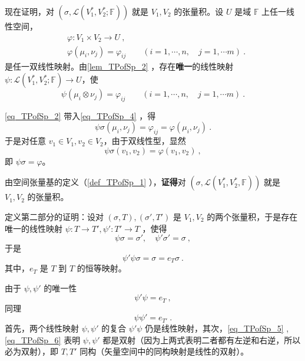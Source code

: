 现在证明，对 $(\sigma,\mathcal L(V_1^*,V_2^*;\mathbb F))$ 就是 $V_1,V_2$ 的张量积。设 $U$ 是域 $\mathbb F$ 上任一线性空间，
\begin{equation}\label{eq_TPofSp_3}
\begin{aligned}
&\varphi:V_1\times V_2\rightarrow U~,\\
&\varphi(\mu_i,\nu_j)=\varphi_{ij}\qquad (i=1,\cdots,n,\quad j=1,\cdots m)~.
\end{aligned}
\end{equation}
是任一双线性映射。由\autoref{lem_TPofSp_2} ，存在\textbf{唯一}的线性映射 $\psi:\mathcal L(V_1^*,V_2^*;\mathbb F)\rightarrow U$，使
\begin{equation}\label{eq_TPofSp_4}
\psi(\mu_i\otimes \nu_j)=\varphi_{ij}\qquad( i=1,\cdots,n,\quad j=1,\cdots m)~.
\end{equation}

\autoref{eq_TPofSp_2} 带入\autoref{eq_TPofSp_4}  ，得
\begin{equation}
\psi\sigma(\mu_i,\nu_j)=\varphi_{ij}=\varphi(\mu_i,\nu_j)~.
\end{equation}
于是对任意 $v_1\in V_1,v_2\in V_2$，由于双线性型，显然
\begin{equation}
\psi\sigma(v_1,v_2)=\varphi(v_1,v_2)~,
\end{equation}
即 $\psi\sigma=\varphi$。

由空间张量基的定义（\autoref{def_TPofSp_1} ），\textbf{证得}对 $(\sigma,\mathcal L(V_1^*,V_2^*,\mathbb F))$ 就是 $V_1,V_2$ 的张量积。

定义第二部分的证明：设对 $(\sigma,T),(\sigma', T')$ 是 $V_1,V_2$ 的两个张量积，于是存在唯一的线性映射 $\psi:T\rightarrow T',\psi':T'\rightarrow T$ ，使得
\begin{equation}
\psi\sigma=\sigma',\quad\psi'\sigma'=\sigma~,
\end{equation}
于是
\begin{equation}
\psi'\psi\sigma=\sigma=e_T\sigma~.
\end{equation}
其中，$e_T$ 是 $T$ 到 $T$ 的恒等映射。

由于 $\psi,\psi'$ 的唯一性
\begin{equation}\label{eq_TPofSp_5}
\psi'\psi=e_T~,
\end{equation}
同理
\begin{equation}\label{eq_TPofSp_6}
\psi\psi'=e_{T'}~.
\end{equation}
首先，两个线性映射 $\psi,\psi'$ 的复合 $\psi'\psi$ 仍是线性映射，其次，\autoref{eq_TPofSp_5} ,\autoref{eq_TPofSp_6} 表明 $\psi,\psi'$ 都是双射（因为上两式表明二者都有左逆和右逆，所以必为双射），即 $T,T'$ 同构（矢量空间中的同构映射是线性的双射）。

